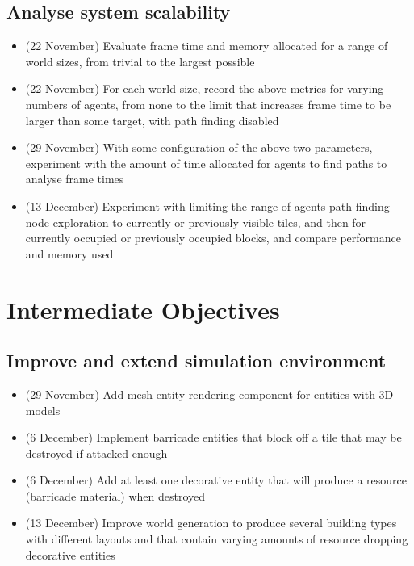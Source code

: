 \documentclass[a4paper,11pt]{article}
\begin{document}
\subsection{Analyse system scalability}
    \begin{itemize}
    \item (22 November) Evaluate frame time and memory allocated for a range of
        world sizes, from trivial to the largest possible
    \item (22 November) For each world size, record the above metrics for
        varying numbers of agents, from none to the limit that increases frame
        time to be larger than some target, with path finding disabled 
    \item (29 November) With some configuration of the above two parameters,
        experiment with the amount of time allocated for agents to find paths
        to analyse frame times
    \item (13 December) Experiment with limiting the range of agents path
        finding node exploration to currently or previously visible tiles, and
        then for currently occupied or previously occupied blocks, and compare
        performance and memory used
    \end{itemize}

\section{Intermediate Objectives}
\subsection{Improve and extend simulation environment}
    \begin{itemize}
    \item (29 November) Add mesh entity rendering component for entities with
        3D models
    \item (6 December) Implement barricade entities that block off a tile that
        may be destroyed if attacked enough
    \item (6 December) Add at least one decorative entity that will produce a
        resource (barricade material) when destroyed
    \item (13 December) Improve world generation to produce several building
        types with different layouts and that contain varying amounts of
        resource dropping decorative entities
    \end{itemize}
\end{document}
